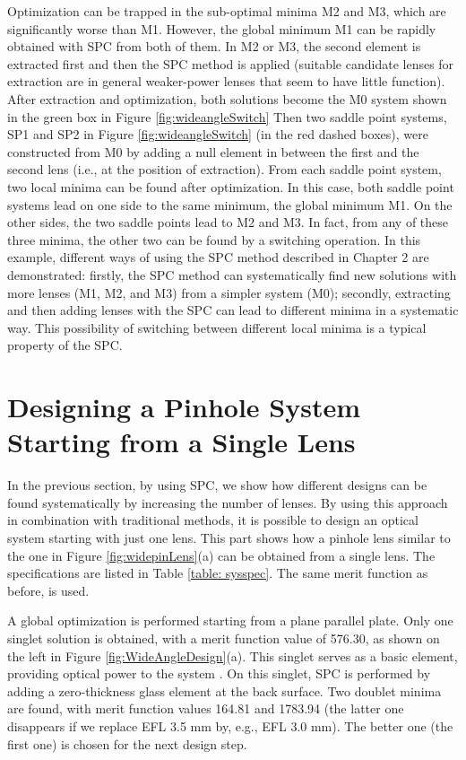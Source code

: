 Optimization can be trapped in the sub-optimal minima M2 and M3, which are significantly worse than M1. However, the global minimum M1 can be rapidly obtained with SPC from both of them. In M2 or M3, the second element is extracted first and then the SPC method is applied (suitable candidate lenses for extraction are in general weaker-power lenses that seem to have little function). After extraction and optimization, both solutions become the M0 system shown in the green box in Figure \ref{fig:wideangleSwitch} Then two saddle point systems, SP1 and SP2 in Figure \ref{fig:wideangleSwitch} (in the red dashed boxes), were constructed from M0 by adding a null element in between the first and the second lens (i.e., at the position of extraction). From each saddle point system, two local minima can be found after optimization. In this case, both saddle point systems lead on one side to the same minimum, the global minimum M1. On the other sides, the two saddle points lead to M2 and M3. In fact, from any of these three minima, the other two can be found by a switching operation. In this example, different ways of using the SPC method described in Chapter 2 are demonstrated: firstly, the SPC method can systematically find new solutions with more lenses (M1, M2, and M3) from a simpler system (M0); secondly, extracting and then adding lenses with the SPC can lead to different minima in a systematic way. This possibility of switching between different local minima is a typical property of the SPC.
\section{Designing a Pinhole System Starting from a Single Lens} \label{chrom90d}

In the previous section, by using SPC, we show how different designs can be found systematically by increasing the number of lenses. By using this approach in combination with traditional methods, it is possible to design an optical system starting with just one lens. This part shows how a pinhole lens similar to the one in Figure \ref{fig:widepinLens}(a) can be obtained from a single lens. The specifications are listed in Table \ref{table: sysspec}. The same merit function as before, is used.

A global optimization is performed starting from a plane parallel plate. Only one singlet solution is obtained, with a merit function value of 576.30, as shown on the left in Figure \ref{fig:WideAngleDesign}(a). This singlet serves as a basic element, providing optical power to the system \cite{LivshitsQA2013}. On this singlet, SPC is performed by adding a zero-thickness glass element at the back surface. Two doublet minima are found, with merit function values 164.81 and 1783.94 (the latter one disappears if we replace EFL 3.5 mm by, e.g., EFL 3.0 mm). The better one (the first one) is chosen for the next design step. 

